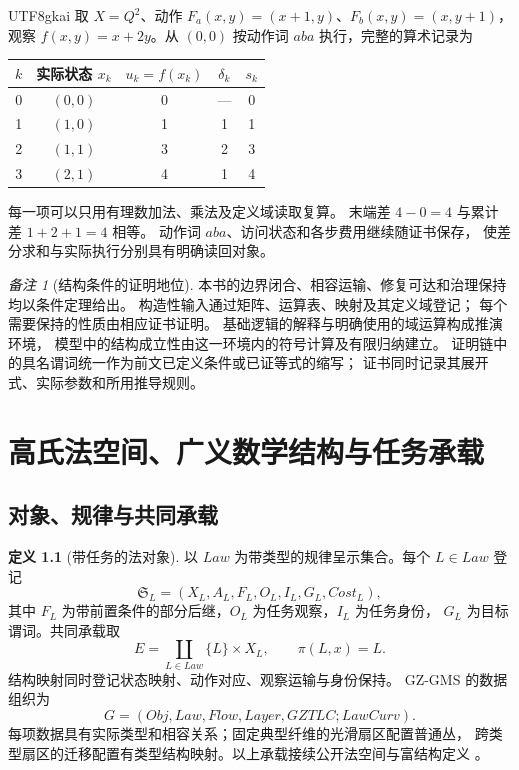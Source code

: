 \documentclass[12pt,a4paper,openany,notitlepage]{report}
\theoremstyle{plain}
\theoremstyle{definition}
\newtheorem{definition}[theorem]{定义}
\theoremstyle{remark}
\newtheorem{remark}[theorem]{备注}
\def\mathcal#1{#1}\def\mathsf#1{#1}\def\mathbb#1{#1}%
\begin{document}
\begin{CJK*}{UTF8}{gkai}
取 $X=\mathbb Q^2$、动作 $F_a(x,y)=(x+1,y)$、$F_b(x,y)=(x,y+1)$，
观察 $f(x,y)=x+2y$。从 $(0,0)$ 按动作词 $aba$ 执行，完整的算术记录为
\begin{center}
\begin{tabular}{ccccc}
\toprule
$k$ & 实际状态 $x_k$ & $u_k=f(x_k)$ & $\delta_k$ & $s_k$\\
\midrule
0 & $(0,0)$ & 0 & --- & 0\\
1 & $(1,0)$ & 1 & 1 & 1\\
2 & $(1,1)$ & 3 & 2 & 3\\
3 & $(2,1)$ & 4 & 1 & 4\\
\bottomrule
\end{tabular}
\end{center}
每一项可以只用有理数加法、乘法及定义域读取复算。
末端差 $4-0=4$ 与累计差 $1+2+1=4$ 相等。
动作词 $aba$、访问状态和各步费用继续随证书保存，
使差分求和与实际执行分别具有明确读回对象。

\begin{remark}[结构条件的证明地位]
本书的边界闭合、相容运输、修复可达和治理保持均以条件定理给出。
构造性输入通过矩阵、运算表、映射及其定义域登记；
每个需要保持的性质由相应证书证明。
基础逻辑的解释与明确使用的域运算构成推演环境，
模型中的结构成立性由这一环境内的符号计算及有限归纳建立。
证明链中的具名谓词统一作为前文已定义条件或已证等式的缩写；
证书同时记录其展开式、实际参数和所用推导规则。
\end{remark}


\chapter{高氏法空间、广义数学结构与任务承载}
\label{exp:ch:law}

\label{hgov:sec:law}

\section{对象、规律与共同承载}

\begin{definition}[带任务的法对象]
\label{hgov:def:law}
以 $\mathsf{Law}$ 为带类型的规律呈示集合。每个 $L\in\mathsf{Law}$ 登记
\[
\mathfrak S_L=(X_L,A_L,F_L,O_L,I_L,G_L,\mathsf{Cost}_L),
\]
其中 $F_L$ 为带前置条件的部分后继，$O_L$ 为任务观察，$I_L$ 为任务身份，
$G_L$ 为目标谓词。共同承载取
\[
\mathcal E=\coprod_{L\in\mathsf{Law}}\{L\}\times X_L,
\qquad \pi(L,x)=L.
\]
结构映射同时登记状态映射、动作对应、观察运输与身份保持。
GZ-GMS 的数据组织为
\[
\mathcal G=(\mathsf{Obj},\mathsf{Law},\mathsf{Flow},
\mathsf{Layer},\mathsf{GZTLC};\mathsf{LawCurv}).
\]
每项数据具有实际类型和相容关系；固定典型纤维的光滑扇区配置普通丛，
跨类型扇区的迁移配置有类型结构映射。以上承载接续公开法空间与富结构定义
\cite{S01,S38}。
\end{definition}


\end{CJK*}
\end{document}
